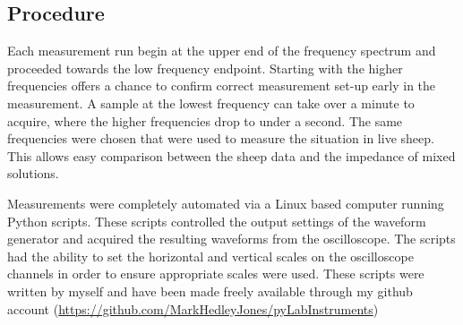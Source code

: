 \subsection{Procedure}

Each measurement run begin at the upper end of the frequency spectrum and proceeded towards the low frequency endpoint.
Starting with the higher frequencies offers a chance to confirm correct measurement set-up early in the measurement.
A sample at the lowest frequency can take over a minute to acquire, where the higher frequencies drop to under a second.
The same frequencies were chosen that were used to measure the situation in live sheep.
This allows easy comparison between the sheep data and the impedance of mixed solutions.

Measurements were completely automated via a Linux based computer running Python scripts.
These scripts controlled the output settings of the waveform generator and acquired the resulting waveforms from the oscilloscope.
The scripts had the ability to set the horizontal and vertical scales on the oscilloscope channels in order to ensure appropriate scales were used.
These scripts were written by myself and have been made freely available through my github account (\url{https://github.com/MarkHedleyJones/pyLabInstruments})

